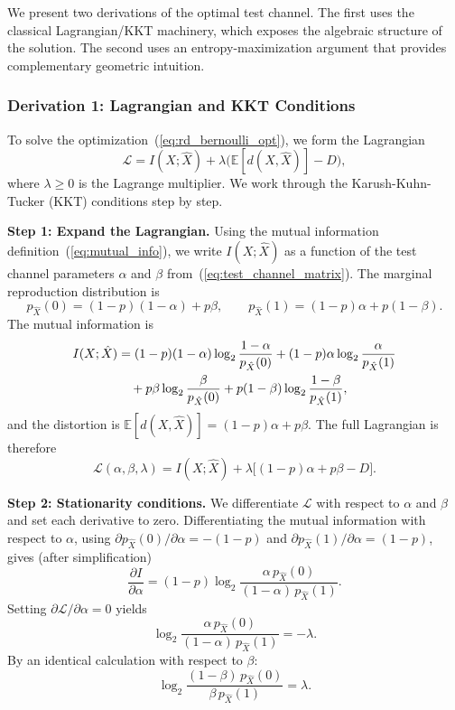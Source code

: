 \documentclass[11pt]{article}
\newcommand{\E}{\mathbb{E}}
\begin{document}
We present two derivations of the optimal test channel.
The first uses the classical Lagrangian/KKT machinery, which exposes the
algebraic structure of the solution.
The second uses an entropy-maximization argument that provides complementary
geometric intuition.

\subsubsection*{Derivation 1: Lagrangian and KKT Conditions}

To solve the optimization~(\ref{eq:rd_bernoulli_opt}), we form the Lagrangian
\begin{equation}
\label{eq:lagrangian}
\mathcal{L} = I(X; \hat{X}) + \lambda \bigl(\E[d(X, \hat{X})] - D\bigr),
\end{equation}
where $\lambda \geq 0$ is the Lagrange multiplier.
We work through the Karush-Kuhn-Tucker (KKT) conditions step by step.

\smallskip
\noindent\textbf{Step 1: Expand the Lagrangian.}
Using the mutual information definition~(\ref{eq:mutual_info}), we write
$I(X;\hat{X})$ as a function of the test channel parameters $\alpha$ and
$\beta$ from~(\ref{eq:test_channel_matrix}).
The marginal reproduction distribution is
\[
p_{\hat{X}}(0) = (1-p)(1-\alpha) + p\beta, \qquad
p_{\hat{X}}(1) = (1-p)\alpha + p(1-\beta).
\]
The mutual information is
\begin{align}
I(X;\hat{X}) &= (1-p)(1-\alpha)\log_2\frac{1-\alpha}{p_{\hat{X}}(0)}
  + (1-p)\alpha\log_2\frac{\alpha}{p_{\hat{X}}(1)} \notag\\
  &\quad + p\beta\log_2\frac{\beta}{p_{\hat{X}}(0)}
  + p(1-\beta)\log_2\frac{1-\beta}{p_{\hat{X}}(1)},
\end{align}
and the distortion is $\E[d(X,\hat{X})] = (1-p)\alpha + p\beta$.
The full Lagrangian is therefore
\[
\mathcal{L}(\alpha,\beta,\lambda) = I(X;\hat{X}) + \lambda\bigl[(1-p)\alpha + p\beta - D\bigr].
\]

\smallskip
\noindent\textbf{Step 2: Stationarity conditions.}
We differentiate $\mathcal{L}$ with respect to $\alpha$ and $\beta$ and set
each derivative to zero.
Differentiating the mutual information with respect to $\alpha$, using
$\partial p_{\hat{X}}(0)/\partial\alpha = -(1-p)$ and
$\partial p_{\hat{X}}(1)/\partial\alpha = (1-p)$, gives (after simplification)
\[
\frac{\partial I}{\partial \alpha}
= (1-p)\log_2\frac{\alpha\, p_{\hat{X}}(0)}{(1-\alpha)\,p_{\hat{X}}(1)}.
\]
Setting $\partial\mathcal{L}/\partial\alpha = 0$ yields
\begin{equation}
\label{eq:kkt_alpha}
\log_2\frac{\alpha\, p_{\hat{X}}(0)}{(1-\alpha)\,p_{\hat{X}}(1)} = -\lambda.
\end{equation}
By an identical calculation with respect to $\beta$:
\begin{equation}
\label{eq:kkt_beta}
\log_2\frac{(1-\beta)\, p_{\hat{X}}(0)}{\beta\,p_{\hat{X}}(1)} = \lambda.
\end{equation}
\end{document}
